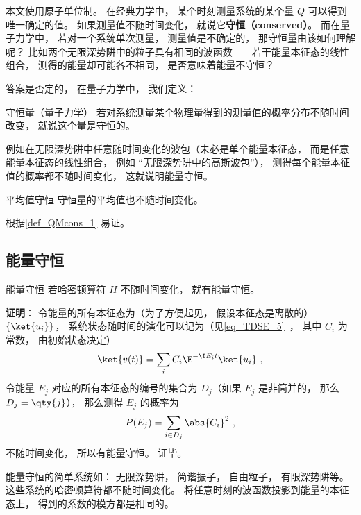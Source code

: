 

本文使用原子单位制。 在经典力学中， 某个时刻测量系统的某个量 $Q$ 可以得到唯一确定的值。 如果测量值不随时间变化， 就说它\textbf{守恒（conserved）}。 而在量子力学中， 若对一个系统单次测量， 测量值是不确定的， 那守恒量由该如何理解呢？ 比如两个无限深势阱中的粒子具有相同的波函数——若干能量本征态的线性组合， 测得的能量却可能各不相同， 是否意味着能量不守恒？

答案是否定的， 在量子力学中， 我们定义：
\begin{definition}{守恒量（量子力学）}\label{def_QMcons_1}
若对系统测量某个物理量得到的测量值的概率分布不随时间改变， 就说这个量是守恒的。
\end{definition}

例如在无限深势阱中任意随时间变化的波包（未必是单个能量本征态， 而是任意能量本征态的线性组合， 例如 “无限深势阱中的高斯波包”）， 测得每个能量本征值的概率都不随时间变化， 这就说明能量守恒。

\begin{corollary}{平均值守恒}
守恒量的平均值也不随时间变化。
\end{corollary}
根据\autoref{def_QMcons_1} 易证。

\subsection{能量守恒}

\begin{theorem}{能量守恒}
若哈密顿算符 $H$ 不随时间变化， 就有能量守恒。
\end{theorem}
\textbf{证明}： 令能量的所有本征态为（为了方便起见， 假设本征态是离散的） $\{\ket{u_i}\}$， 系统状态随时间的演化可以记为（见\autoref{eq_TDSE_5}~， 其中 $C_i$ 为常数， 由初始状态决定）
\begin{equation}
\ket{v(t)} = \sum_i C_i \E^{-\I E_i t} \ket{u_i}~,
\end{equation}
令能量 $E_j$ 对应的所有本征态的编号的集合为 $D_j$（如果 $E_j$ 是非简并的， 那么 $D_j = \qty{j}$），%
那么测得 $E_j$ 的概率为
\begin{equation}
P(E_j) = \sum_{i \in D_j} \abs{C_i}^2~,
\end{equation}
不随时间变化， 所以有能量守恒。 证毕。

\begin{example}{}
能量守恒的简单系统如： 无限深势阱， 简谐振子， 自由粒子， 有限深势阱等。 这些系统的哈密顿算符都不随时间变化。 将任意时刻的波函数投影到能量的本征态上， 得到的系数的模方都是相同的。
\end{example}

